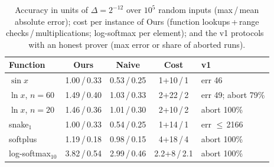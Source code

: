 \begin{table}[t]\centering\footnotesize
\caption{Accuracy in units of $\Delta=2^{-12}$ over $10^5$ random inputs (max\,/\,mean absolute error); cost per instance of \textsf{Ours} (function lookups\,+\,range checks\,/\,multiplications; log-softmax per element); and the v1 protocols~\cite{chen2025thesis} with an honest prover (max error or share of aborted runs).}
\label{tab:prec}
\setlength{\tabcolsep}{2.5pt}
\begin{tabular}{lcccl}\toprule
Function & \textsf{Ours} & \textsf{Naive} & Cost & v1 \\\midrule
$\sin x$ & 1.00\,/\,0.33 & 0.53\,/\,0.25 & 1+10\,/\,1 & err 46\\
$\ln x$, $n{=}60$ & 1.49\,/\,0.40 & 1.03\,/\,0.33 & 2+22\,/\,2 & err 49; abort 79\%\\
$\ln x$, $n{=}20$ & 1.46\,/\,0.36 & 1.01\,/\,0.30 & 2+10\,/\,2 & abort 100\%\\
snake$_1$ & 1.00\,/\,0.33 & 0.54\,/\,0.25 & 1+14\,/\,1 & err $\le$\,2166\\
softplus & 1.19\,/\,0.18 & 0.98\,/\,0.15 & 4+18\,/\,4 & abort 100\%\\
log-softmax$_{10}$ & 3.82\,/\,0.54 & 2.99\,/\,0.46 & 2.2+8\,/\,2.1 & abort 100\%\\
\bottomrule\end{tabular}
\end{table}
